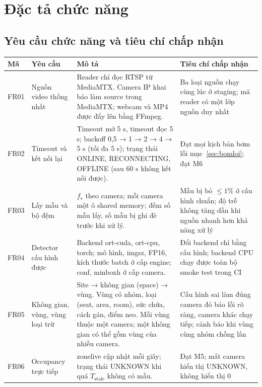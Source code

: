 \documentclass[10pt,a4paper,oneside,openany]{report}
\newcommand{\breakus}{\textunderscore\allowbreak}
\newcommand{\code}[1]{{\ttfamily\let\_\breakus #1}}
\newcommand{\tabhead}[1]{\textsf{\bfseries\color{ink}#1}}
\newenvironment{bang}{\par\small\rowcolors{2}{rowgray}{white}}{\par\vspace{0.3em}}
\begin{document}
\chapter{Đặc tả chức năng}\label{ch:chucnang}

\section{Yêu cầu chức năng và tiêu chí chấp nhận}
\begin{bang}
\begin{xltabular}{\linewidth}{L{10mm}L{32mm}Y L{44mm}}
\toprule
\tabhead{Mã} & \tabhead{Yêu cầu} & \tabhead{Mô tả} & \tabhead{Tiêu chí chấp nhận} \\
\midrule
\endhead
FR01 & Nguồn video thống nhất & Reader chỉ đọc RTSP từ MediaMTX. Camera IP khai báo làm \code{source} trong MediaMTX; webcam và MP4 được đẩy lên bằng FFmpeg. & Ba loại nguồn chạy cùng lúc ở staging; mã reader có một lớp nguồn duy nhất \\
FR02 & Timeout và kết nối lại & Timeout mở 5 s, timeout đọc 5 s; backoff 0,5 → 1 → 2 → 4 → 5 s (tối đa 5 s); trạng thái \code{ONLINE}, \code{RECONNECTING}, \code{OFFLINE} (sau 60 s không kết nối được). & Đạt mọi kịch bản bơm lỗi mục~\ref{sec:bomloi}; đạt M6 \\
FR03 & Lấy mẫu và bộ đệm & $f_s$ theo camera; mỗi camera một ô shared memory; đếm số mẫu lấy, số mẫu bị ghi đè trước khi xử lý. & Mẫu bị bỏ $\le 1\%$ ở cấu hình chuẩn; độ trễ không tăng dần khi nguồn nhanh hơn khả năng xử lý \\
FR04 & Detector cấu hình được & Backend \code{ort-cuda}, \code{ort-cpu}, \code{torch}; mô hình, \code{imgsz}, FP16, kích thước batch ở cấp engine; \code{conf}, \code{min\_box\_h} ở cấp camera. & Đổi backend chỉ bằng cấu hình; backend CPU chạy được toàn bộ smoke test trong CI \\
FR05 & Không gian, vùng, vùng loại trừ & Site → không gian (space) → vùng. Vùng có nhóm, loại (\code{seat}, \code{area}, \code{room}), sức chứa, cách gán, điểm neo. Mỗi vùng thuộc một camera; một không gian có thể gồm vùng của nhiều camera. & Cấu hình sai làm đúng camera đó báo lỗi rõ ràng, camera khác chạy tiếp; cảnh báo khi vùng cùng nhóm chồng lấn \\
FR06 & Occupancy trực tiếp & \code{zone\_live} cập nhật mỗi giây; trạng thái \code{UNKNOWN} khi quá $T_{\text{stale}}$ không có mẫu. & Đạt M5; mất camera hiển thị \code{UNKNOWN}, không hiển thị 0 \\

\end{xltabular}
\end{bang}
\end{document}
